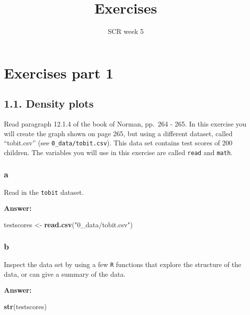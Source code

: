 \documentclass[]{article}
\title{Exercises}
\subtitle{SCR week 5}
\author{}
\date{}
\newenvironment{Shaded}{\begin{snugshade}}{\end{snugshade}}
\newcommand{\KeywordTok}[1]{\textcolor[rgb]{0.13,0.29,0.53}{\textbf{#1}}}
\newcommand{\NormalTok}[1]{#1}
\newcommand{\StringTok}[1]{\textcolor[rgb]{0.31,0.60,0.02}{#1}}
\begin{document}
\maketitle

\hypertarget{exercises-part-1}{%
\section{Exercises part 1}\label{exercises-part-1}}

\hypertarget{density-plots}{%
\subsection{1.1. Density plots}\label{density-plots}}

Read paragraph 12.1.4 of the book of Norman, pp.~264 - 265. In this
exercise you will create the graph shown on page 265, but using a
different dataset, called ``tobit.csv'' (see
\texttt{0\_data/tobit.csv}). This data set contains test scores of 200
children. The variables you will use in this exercise are called
\texttt{read} and \texttt{math}.

\hypertarget{a}{%
\subsubsection{a}\label{a}}

Read in the \texttt{tobit} dataset.

\textbf{Answer:}

\begin{Shaded}
\begin{Highlighting}[]
\NormalTok{testscores <-}\StringTok{ }\KeywordTok{read.csv}\NormalTok{(}\StringTok{"0_data/tobit.csv"}\NormalTok{)}
\end{Highlighting}
\end{Shaded}

\hypertarget{b}{%
\subsubsection{b}\label{b}}

Inspect the data set by using a few \texttt{R} functions that explore
the structure of the data, or can give a summary of the data.

\textbf{Answer:}

\begin{Shaded}
\begin{Highlighting}[]
\KeywordTok{str}\NormalTok{(testscores)}
\end{Highlighting}
\end{Shaded}
\end{document}
